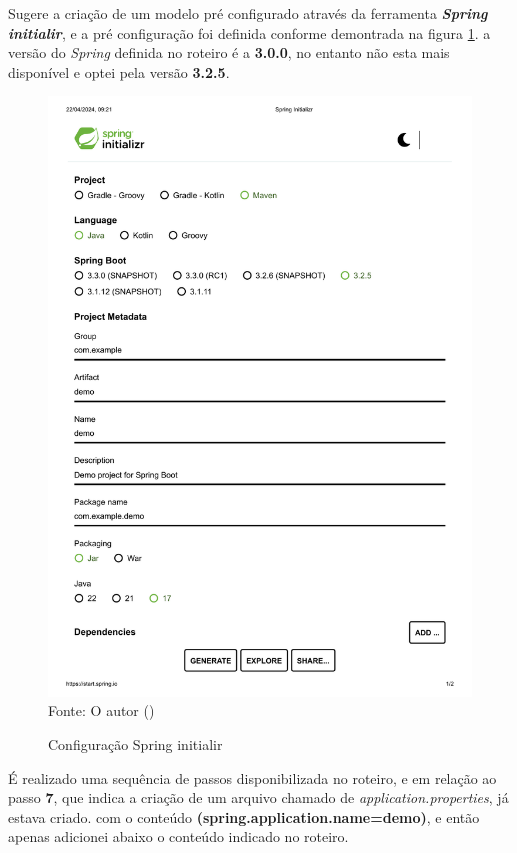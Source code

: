 \par Sugere a criação de um modelo pré configurado através da ferramenta \textit{\textbf{Spring initialir}}, e a pré configuração foi definida conforme demontrada na figura \ref{fig:spring}. a versão do \textit{Spring} definida no roteiro é a \textbf{3.0.0}, no entanto não esta mais disponível e optei pela versão \textbf{3.2.5}.


\begin{figure}[H]
\center
  \caption{Configuração Spring initialir}
  \includegraphics[width=\textwidth]{figure/Spring Initializr.pdf}
  \label{fig:spring}
  \flushleft %
    {\fontsize{10pt}{\baselineskip}\selectfont
    Fonte: O autor (\the\year) }
\end{figure}


\par É realizado uma sequência de passos disponibilizada no roteiro, e em relação ao passo \textbf{7}, que indica a criação de um arquivo chamado de \textit{application.properties}, já estava criado. com o conteúdo \textbf{(spring.application.name=demo)}, e então apenas adicionei abaixo o conteúdo indicado no roteiro.



